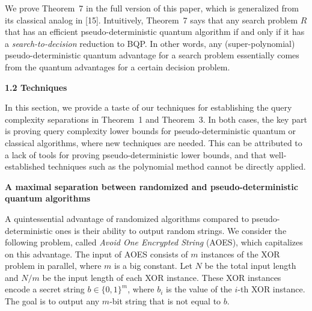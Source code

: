


We prove Theorem 7 in the full version of this paper, which is generalized from its classical analog in [15]. Intuitively, Theorem 7 says that any search problem $R$ that has an efficient pseudo-deterministic quantum algorithm if and only if it has a \emph{search-to-decision} reduction to BQP. In other words, any (super-polynomial) pseudo-deterministic quantum advantage for a search problem essentially comes from the quantum advantages for a certain decision problem.\par







\par\medskip\noindent\textbf{
1.2 Techniques}\par




In this section, we provide a taste of our techniques for establishing the query complexity separations in Theorem 1 and Theorem 3. In both cases, the key part is proving query complexity lower bounds for pseudo-deterministic quantum or classical algorithms, where new techniques are needed. This can be attributed to a lack of tools for proving pseudo-deterministic lower bounds, and that well-established techniques such as the polynomial method cannot be directly applied.\par




\par\medskip\noindent\textbf{A maximal separation between randomized and pseudo-deterministic quantum algorithms}\par




A quintessential advantage of randomized algorithms compared to pseudo-deterministic ones is their ability to output random strings.
We consider the following problem, called \emph{Avoid One Encrypted String} (AOES), which capitalizes on this advantage. The input of AOES consists of $m$ instances of the XOR problem in parallel, where $m$ is a big constant. Let $N$ be the total input length and $N/m$ be the input length of each XOR instance. These XOR instances encode a secret string $b\in\{0,1\}^{m}$, where $b_{i}$ is the value of the $i$-th XOR instance. The goal is to output any $m$-bit string that is not equal to $b$.\par




